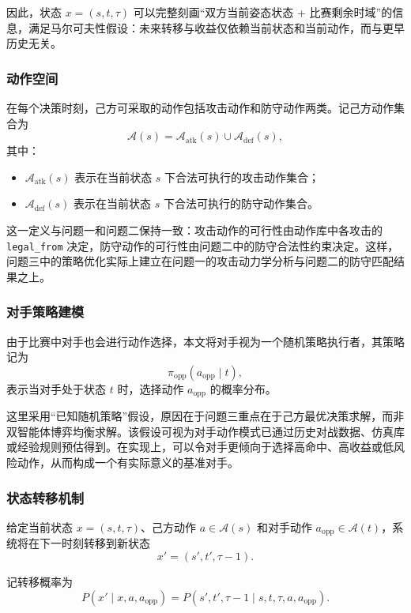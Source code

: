 因此，状态 \(x=(s,t,\tau)\) 可以完整刻画“双方当前姿态状态 + 比赛剩余时域”的信息，满足马尔可夫性假设：未来转移与收益仅依赖当前状态和当前动作，而与更早历史无关。

\subsubsection{动作空间}

在每个决策时刻，己方可采取的动作包括攻击动作和防守动作两类。记己方动作集合为
\[
\mathcal{A}(s)=\mathcal{A}_{\text{atk}}(s)\cup \mathcal{A}_{\text{def}}(s),
\]
其中：
\begin{itemize}
    \item \(\mathcal{A}_{\text{atk}}(s)\) 表示在当前状态 \(s\) 下合法可执行的攻击动作集合；
    \item \(\mathcal{A}_{\text{def}}(s)\) 表示在当前状态 \(s\) 下合法可执行的防守动作集合。
\end{itemize}

这一定义与问题一和问题二保持一致：攻击动作的可行性由动作库中各攻击的 \texttt{legal\_from} 决定，防守动作的可行性由问题二中的防守合法性约束决定。这样，问题三中的策略优化实际上建立在问题一的攻击动力学分析与问题二的防守匹配结果之上。

\subsubsection{对手策略建模}

由于比赛中对手也会进行动作选择，本文将对手视为一个随机策略执行者，其策略记为
\[
\pi_{\text{opp}}(a_{\text{opp}}\mid t),
\]
表示当对手处于状态 \(t\) 时，选择动作 \(a_{\text{opp}}\) 的概率分布。

这里采用“已知随机策略”假设，原因在于问题三重点在于己方最优决策求解，而非双智能体博弈均衡求解。该假设可视为对手动作模式已通过历史对战数据、仿真库或经验规则预估得到。在实现上，可以令对手更倾向于选择高命中、高收益或低风险动作，从而构成一个有实际意义的基准对手。

\subsubsection{状态转移机制}

给定当前状态 \(x=(s,t,\tau)\)、己方动作 \(a\in\mathcal{A}(s)\) 和对手动作 \(a_{\text{opp}}\in\mathcal{A}(t)\)，系统将在下一时刻转移到新状态
\[
x'=(s',t',\tau-1).
\]

记转移概率为
\[
P(x'\mid x,a,a_{\text{opp}})
=
P(s',t',\tau-1\mid s,t,\tau,a,a_{\text{opp}}).
\]

